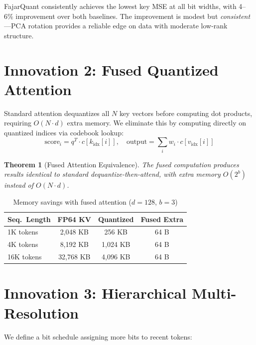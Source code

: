 \documentclass[10pt,twocolumn]{article}
\newtheorem{theorem}{Theorem}
\begin{document}
FajarQuant consistently achieves the lowest key MSE at all bit widths, with 4--6\% improvement over both baselines. The improvement is modest but \textit{consistent}---PCA rotation provides a reliable edge on data with moderate low-rank structure.

\section{Innovation 2: Fused Quantized Attention}
\label{sec:fused}

Standard attention dequantizes all $N$ key vectors before computing dot products, requiring $O(N \cdot d)$ extra memory. We eliminate this by computing directly on quantized indices via codebook lookup:
\begin{equation}
\text{score}_i = q^T \cdot c[k_{\text{idx}}[i]], \quad
\text{output} = \sum_i w_i \cdot c[v_{\text{idx}}[i]]
\end{equation}

\begin{theorem}[Fused Attention Equivalence]
The fused computation produces results identical to standard dequantize-then-attend, with extra memory $O(2^b)$ instead of $O(N \cdot d)$.
\end{theorem}

\begin{table}[t]
\centering
\small
\caption{Memory savings with fused attention ($d{=}128$, $b{=}3$)}
\label{tab:memory}
\begin{tabular}{lccc}
\toprule
Seq.\ Length & FP64 KV & Quantized & Fused Extra \\
\midrule
1K tokens & 2,048 KB & 256 KB & 64 B \\
4K tokens & 8,192 KB & 1,024 KB & 64 B \\
16K tokens & 32,768 KB & 4,096 KB & 64 B \\
\bottomrule
\end{tabular}
\end{table}

\section{Innovation 3: Hierarchical Multi-Resolution}

We define a bit schedule assigning more bits to recent tokens:
\end{document}
